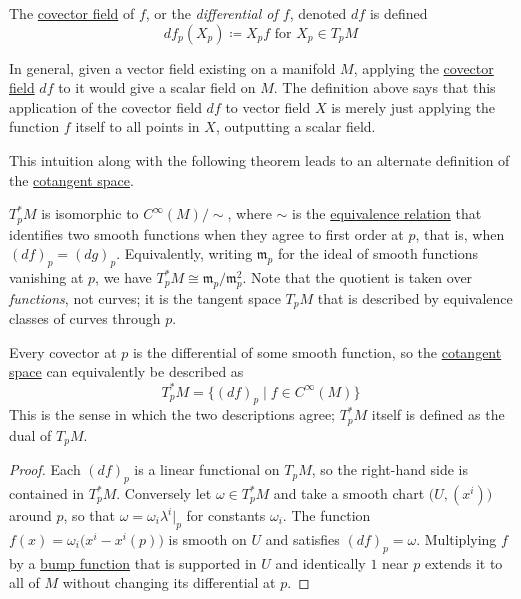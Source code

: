 \documentclass{article}
\newcounter{theorem}[section]
\newcounter{definition}[section]
\begin{document}
    \begin{definition}[Differential of $f$]
      \label{def:differential-of-f}
    The \hyperref[def:covector-field]{covector field} of $f$, or the \textit{differential of $f$}, denoted $df$ is defined
    \begin{equation}
      df_p (X_p) \coloneqq X_p f \text{ for } X_p \in T_p M
    \end{equation}
    \end{definition}

    In general, given a vector field existing on a manifold $M$, applying the \hyperref[def:covector-field]{covector field} $df$ to it would give a scalar field on $M$. The definition above says that this application of the covector field $df$ to vector field $X$ is merely just applying the function $f$ itself to all points in $X$, outputting a scalar field. 

    This intuition along with the following theorem leads to an alternate definition of the \hyperref[def:cotangent-space]{cotangent space}. 

    \begin{theorem}
      \label{thm:cotangent-space-as-a-quotient-of-cinftym}
    $T_p^* M$ is isomorphic to $C^\infty(M) / \sim$, where $\sim$ is the \hyperref[st-def:equivalence_relation]{equivalence relation} that identifies two smooth functions when they agree to first order at $p$, that is, when $(df)_p = (dg)_p$. Equivalently, writing $\mathfrak{m}_p$ for the ideal of smooth functions vanishing at $p$, we have $T_p^* M \cong \mathfrak{m}_p / \mathfrak{m}_p^2$. Note that the quotient is taken over \textit{functions}, not curves; it is the tangent space $T_p M$ that is described by equivalence classes of curves through $p$. 
    \end{theorem}

    \begin{theorem}
      \label{thm:differentials-span-the-cotangent-space}
    Every covector at $p$ is the differential of some smooth function, so the \hyperref[def:cotangent-space]{cotangent space} can equivalently be described as 
    \begin{equation}
      T_p^* M = \{ (d f)_{p} \; | \; f \in C^{\infty} (M) \}
    \end{equation}
    This is the sense in which the two descriptions agree; $T_p^* M$ itself is defined as the dual of $T_p M$. 
    \end{theorem}
    \begin{proof}
    Each $(df)_p$ is a linear functional on $T_p M$, so the right-hand side is contained in $T_p^* M$. Conversely let $\omega \in T_p^* M$ and take a smooth chart $\big(U, (x^i)\big)$ around $p$, so that $\omega = \omega_i \lambda^i \big|_p$ for constants $\omega_i$. The function $f(x) = \omega_i \big( x^i - x^i(p) \big)$ is smooth on $U$ and satisfies $(df)_p = \omega$. Multiplying $f$ by a \hyperref[thm:smooth-bump-function-on-rn]{bump function} that is supported in $U$ and identically $1$ near $p$ extends it to all of $M$ without changing its differential at $p$. 
    \end{proof}
\end{document}

